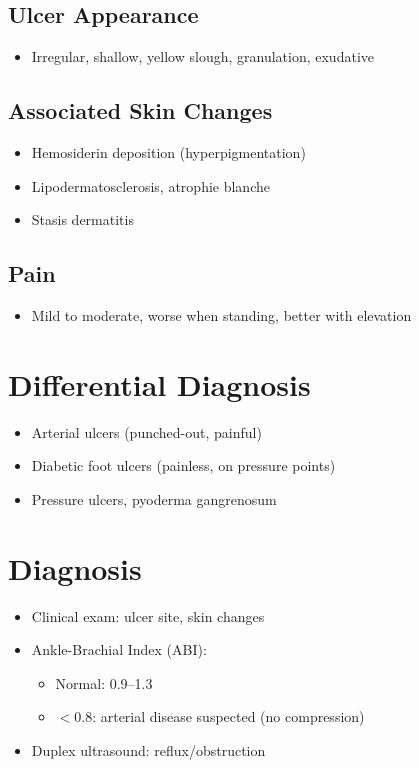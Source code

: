 \documentclass{article}
\begin{document}
\subsection*{Ulcer Appearance}
\begin{itemize}[noitemsep]
    \item Irregular, shallow, yellow slough, granulation, exudative
\end{itemize}

\subsection*{Associated Skin Changes}
\begin{itemize}[noitemsep]
    \item Hemosiderin deposition (hyperpigmentation)
    \item Lipodermatosclerosis, atrophie blanche
    \item Stasis dermatitis
\end{itemize}

\subsection*{Pain}
\begin{itemize}[noitemsep]
    \item Mild to moderate, worse when standing, better with elevation
\end{itemize}

\section*{Differential Diagnosis}
\begin{itemize}[noitemsep]
    \item Arterial ulcers (punched-out, painful)
    \item Diabetic foot ulcers (painless, on pressure points)
    \item Pressure ulcers, pyoderma gangrenosum
\end{itemize}

\section*{Diagnosis}
\begin{itemize}[noitemsep]
    \item Clinical exam: ulcer site, skin changes
    \item Ankle-Brachial Index (ABI):
    \begin{itemize}
        \item Normal: 0.9–1.3
        \item $<$0.8: arterial disease suspected (no compression)
    \end{itemize}
    \item Duplex ultrasound: reflux/obstruction
\end{itemize}
\end{document}
